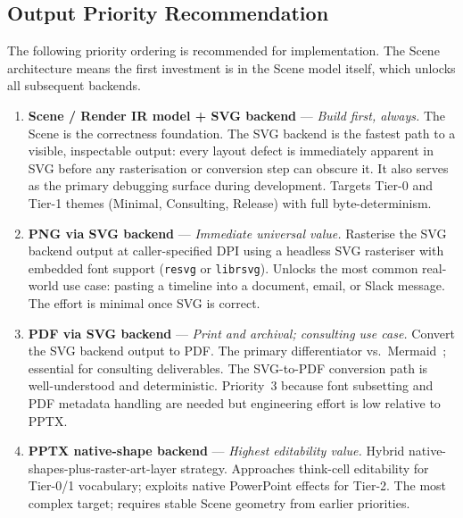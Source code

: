 \subsection{Output Priority Recommendation}
\label{sec:output-priority}

The following priority ordering is recommended for implementation. The Scene architecture
means the first investment is in the Scene model itself, which unlocks all subsequent
backends.

\begin{enumerate}
  \item \textbf{Scene / Render IR model + SVG backend} --- \emph{Build first, always.}
        The Scene is the correctness foundation. The SVG backend is the fastest path to
        a visible, inspectable output: every layout defect is immediately apparent in SVG
        before any rasterisation or conversion step can obscure it. It also serves as the
        primary debugging surface during development. Targets Tier-0 and Tier-1 themes
        (Minimal, Consulting, Release) with full byte-determinism.

  \item \textbf{PNG via SVG backend} --- \emph{Immediate universal value.}
        Rasterise the SVG backend output at caller-specified DPI using a headless SVG
        rasteriser with embedded font support (\texttt{resvg} or \texttt{librsvg}).
        Unlocks the most common real-world use case: pasting a timeline into a document,
        email, or Slack message. The effort is minimal once SVG is correct.

  \item \textbf{PDF via SVG backend} --- \emph{Print and archival; consulting use case.}
        Convert the SVG backend output to PDF. The primary differentiator
        vs.\ Mermaid~\cite{mermaid2023}; essential for consulting deliverables.
        The SVG-to-PDF conversion path is well-understood and deterministic.
        Priority~3 because font subsetting and PDF metadata handling are needed but
        engineering effort is low relative to PPTX.

  \item \textbf{PPTX native-shape backend} --- \emph{Highest editability value.}
        Hybrid native-shapes-plus-raster-art-layer strategy. Approaches think-cell
        editability for Tier-0/1 vocabulary; exploits native PowerPoint effects for
        Tier-2. The most complex target; requires stable Scene geometry from earlier
        priorities.


\end{enumerate}
